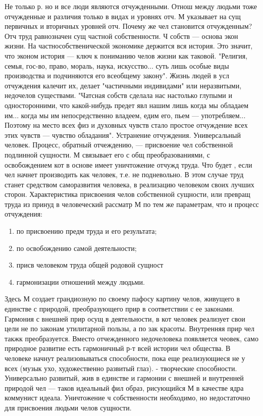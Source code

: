 \documentclass[12pt]{article}
\begin{document}
Не только р. но и все люди являются отчужденными. Отнош между людьми тоже отчужденные и различия
только в видах и уровнях отч. М указывает на сущ первичных и вторичных уровней отч. Почему же чел
становится отчужденным?
Отч труд равнозначен сущ частной собственности. Ч собств --- основа экон жизни. На частнособственической
экономике держится вся история. Это значит, что эконом история --- ключ к пониманию челов жизни как таковой.
"Религия, семья, гос-во, право, мораль, наука, искусство... суть лишь особые виды производства и подчиняются
его всеобщему закону". Жизнь людей в усл отчуждения калечит их, делает "частичными индивидами" или
неразвитыми, недочелов существами. "Чатсная собств сделала нас настолько глупыми и односторонними, что
какой-нибудь предет явл нашим лишь когда мы обладаем им... когда мы им непосредственно владеем, едим его,
пьем --- употребляем... Поэтому на место всех физ и духовных чувств стало простое отчуждение всех этих чувств
--- чувство обладания".
Устранение  отчуждения.  Универсальный  человек.  Процесс,  обратный  отчеждению,  ---  присвоение  чел
собственной подлинной сущности. М связывает его с общ преобразованиями, с освобождением кот в основе
имеет уничтожение отчужд труда. Что будет , если чел начнет производить как человек, т.е. не подневольно. В
этом случае труд станет средством саморазвития человека, в реализацию человеком своих лучших сторон.
Характеристика  присвоения  челов  собственной  сущности,  или  превращ  труда  из  принуд  в  человеческий
рассматр М по тем же параметрам, что и процесс отчуждения:
\begin{enumerate}
  \item по присвоению предм труда и его результата;
\item по  освобождению  самой  деятельности; 
\item присв  человеком  труда  общей  родовой  сущност
\item гармонизации
отношений между людьми.
\end{enumerate}
Здесь  М  создает  грандиозную  по  своему  пафосу  картину  челов,  живущего  в  единстве  с  природой,
преобразующего прир в соответствии с ее законами. Гармония с внешней прир осущ в деятельности, в кот
человек реализует свои цели не по законам утилитарной пользы, а по зак красоты. Внутренняя прир чел такжк
преобразуется.  Вместо  отчежденного  недочеловека  появляется  чеовек,  само  природное  развитие  есть
гармоничный  р-т  всей  истории  чел  общества.  В  человеке  начнут  реализовываться  способности,  пока  еще
реализующиеся не у всех (музык ухо, художественно развитый глаз). - творческие способности.
Универсально развитый, жив в единстве и гармонии с внешней и внутренней природой чел --- таков идеальный
фил образ, рисующийся М в качестве ядра коммунист идеала. Уничтожение ч собственности необходимо, но
недостаточно для присвоения людьми челов сущности.
\end{document}
